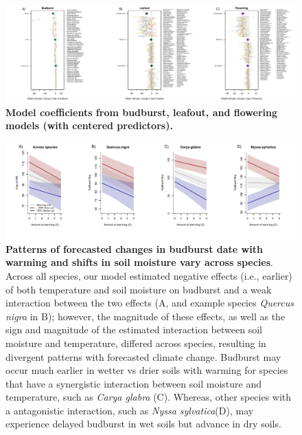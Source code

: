 \documentclass{article}
\begin{document}
\begin{figure}[h]
\centering
 \includegraphics{../../Analyses/soilmoisture/figures/m5_bbdlofl.pdf}
 \caption{\textbf{Model coefficients from budburst, leafout, and flowering models (with centered predictors).}} 
 \label{fig:bblofl}
 \end{figure}
 

 \begin{figure}[h]
\centering
 \includegraphics{../../Analyses/soilmoisture/figures/tempforecast_bb_0_5_135_28_105_4_degwarm.pdf}
 
 \caption{\textbf{Patterns of forecasted changes in budburst date with warming and shifts in soil moisture vary across species}. Across all species, our model estimated negative effects (i.e., earlier) of both temperature and soil moisture on budburst and a weak interaction between the two effects (A, and example species  \textit{Quercus nigra} in B); however, the magnitude of these effects, as well as the sign and magnitude of the estimated interaction between soil moisture and temperature, differed across species, resulting in divergent patterns with forecasted climate change.  Budburst may occur much earlier in wetter vs drier soils with warming for species that have a synergistic interaction between soil moisture and temperature, such as \textit{Carya glabra} (C). Whereas, other species with a antagonistic interaction, such as \textit{Nyssa sylvatica}(D), may experience delayed budburst in wet soils but advance in dry soils.}
 \label{fig:bbsp}
 \end{figure}

\end{document}
